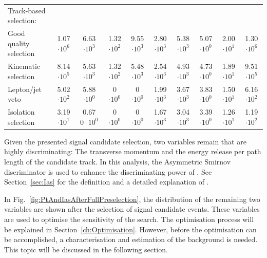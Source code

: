 \begin{table}
{\begin{tabular}{|l|c|c|c|c|c|c|c|c|c|}
Track-based selection:                                                                    
& & & & & & & & & \\
Good quality selection                                                                    & 1.07 $\cdot10^{6 }$ & 6.63 $\cdot10^{3 }$ & 1.32 $\cdot10^{2 }$ & 9.55 $\cdot10^{3 }$ & 2.80 $\cdot10^{3 }$ & 5.38 $\cdot10^{3 }$ & 5.07 $\cdot10^{0 }$ & 2.00 $\cdot10^{1 }$ & 1.30 $\cdot10^{6 }$ \\
Kinematic selection                                                                       & 8.14 $\cdot10^{5 }$ & 5.63 $\cdot10^{3 }$ & 1.32 $\cdot10^{2 }$ & 5.48 $\cdot10^{3 }$ & 2.54 $\cdot10^{3 }$ & 4.93 $\cdot10^{3 }$ & 4.73 $\cdot10^{0 }$ & 1.89 $\cdot10^{1 }$ & 9.51 $\cdot10^{5 }$ \\
Lepton/jet veto                                                                           & 5.02 $\cdot10^{2 }$ & 5.88 $\cdot10^{0 }$ & 0 $\cdot10^{0}$ & 0 $\cdot10^{0}$ & 1.99 $\cdot10^{3 }$ & 3.67 $\cdot10^{3 }$ & 3.83 $\cdot10^{0 }$ & 1.50 $\cdot10^{1 }$ & 6.16 $\cdot10^{2 }$ \\
Isolation selection                                                                       & 3.19 $\cdot10^{1 }$ & 0.67 $0\cdot10^{0 }$ & 0 $\cdot10^{0}$ & 0 $\cdot10^{0}$ & 1.67 $\cdot10^{3 }$ & 3.04 $\cdot10^{3 }$ & 3.39 $\cdot10^{0 }$ & 1.26 $\cdot10^{1 }$ & 1.19 $\cdot10^{2 }$ \\
\bottomrule
\end{tabular}}
\end{table}

Given the presented signal candidate selection, two variables remain that are highly discriminating:
The transverse momentum \pt and the energy release per path length \dedx of the candidate track.
In this analysis, the Asymmetric Smirnov discriminator \ias is used to enhance the discriminating power of \dedx.
See Section~\ref{sec:Ias} for the definition and a detailed explanation of \ias.

In Fig.~\ref{fig:PtAndIasAfterFullPreselection}, the distribution of the remaining two variables are shown after the selection of signal candidate events.
These variables are used to optimise the sensitivity of the search.
The optimisation process will be explained in Section~\ref{ch:Optimisation}.
However, before the optimisation can be accomplished, a characterisation and estimation of the background is needed.
This topic will be discussed in the following section.

